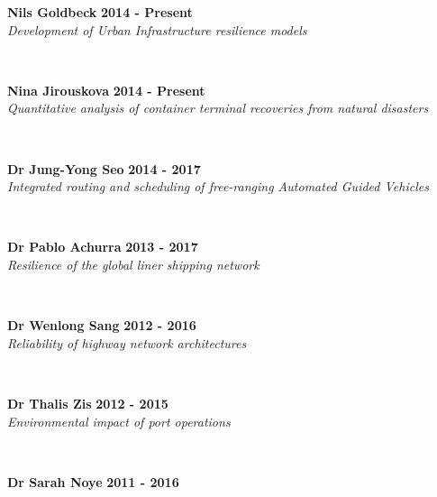 \documentclass[margin]{res}
\newcommand\tab[1][1cm]{\hspace*{#1}}
\begin{document}
\begin{resume}
	\vspace{0.03in}
	\begin{minipage}{\textwidth}
	{\bf Nils Goldbeck} \hfill {\bf 2014 - Present} \\
	\tab[0.2in] \textit{Development of Urban Infrastructure resilience models}
	\end{minipage}
	\\
	\vspace{0.03in}
	\begin{minipage}{\textwidth}
	{\bf Nina Jirouskova} \hfill {\bf 2014 - Present} \\
	\tab[0.2in] \textit{Quantitative analysis of container terminal recoveries from natural disasters}
	\end{minipage}
	\\
	\vspace{0.03in}
	\begin{minipage}{\textwidth}
	{\bf Dr Jung-Yong Seo} \hfill {\bf 2014 - 2017} \\
	\tab[0.2in] \textit{Integrated routing and scheduling of free-ranging Automated Guided Vehicles}
	\end{minipage}
	\\
	\vspace{0.03in}
	\begin{minipage}{\textwidth}
	{\bf Dr Pablo Achurra} \hfill {\bf 2013 - 2017} \\
	\tab[0.2in] \textit{Resilience of the global liner shipping network}
	\end{minipage}
	\\
	\vspace{0.03in}
	\begin{minipage}{\textwidth}
	{\bf Dr Wenlong Sang} \hfill {\bf 2012 - 2016} \\
	\tab[0.2in] \textit{Reliability of highway network architectures}
	\end{minipage}
	\\
	\vspace{0.03in}
	\begin{minipage}{\textwidth}
	{\bf Dr Thalis Zis} \hfill {\bf 2012 - 2015} \\
	\tab[0.2in] \textit{Environmental impact of port operations}
	\end{minipage}
	\\
	\vspace{0.03in}
	\begin{minipage}{\textwidth}
	{\bf Dr Sarah Noye} \hfill {\bf 2011 - 2016} \\

\end{minipage}
\end{resume}
\end{document}
